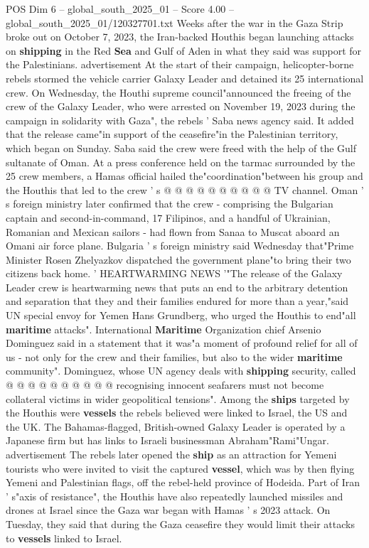 \begin{textsample}{POS Dim 6 – global\_south\_2025\_01 – Score 4.00 – global\_south\_2025\_01/120327701.txt}  \label{ex:f6_pos_353}
Weeks after the war in the Gaza Strip broke out on October 7, 2023, the Iran-backed Houthis began launching attacks on \textbf{shipping} in the Red \textbf{Sea} and Gulf of Aden in what they said was support for the Palestinians. advertisement At the start of their campaign, helicopter-borne rebels stormed the vehicle carrier Galaxy Leader and detained its 25 international crew.
On Wednesday, the Houthi supreme council"announced the freeing of the crew of the Galaxy Leader, who were arrested on November 19, 2023 during the campaign in solidarity with Gaza", the rebels ' Saba news agency said.
It added that the release came"in support of the ceasefire"in the Palestinian territory, which began on Sunday.
Saba said the crew were freed with the help of the Gulf sultanate of Oman.
At a press conference held on the tarmac surrounded by the 25 crew members, a Hamas official hailed the"coordination"between his group and the Houthis that led to the crew ' s @ @ @ @ @ @ @ @ @ @ TV channel.
Oman ' s foreign ministry later confirmed that the crew - comprising the Bulgarian captain and second-in-command, 17 Filipinos, and a handful of Ukrainian, Romanian and Mexican sailors - had flown from Sanaa to Muscat aboard an Omani air force plane.
Bulgaria ' s foreign ministry said Wednesday that"Prime Minister Rosen Zhelyazkov dispatched the government plane"to bring their two citizens back home. ' HEARTWARMING NEWS '"The release of the Galaxy Leader crew is heartwarming news that puts an end to the arbitrary detention and separation that they and their families endured for more than a year,"said UN special envoy for Yemen Hans Grundberg, who urged the Houthis to end"all \textbf{maritime} attacks".
International \textbf{Maritime} Organization chief Arsenio Dominguez said in a statement that it was"a moment of profound relief for all of us - not only for the crew and their families, but also to the wider \textbf{maritime} community".
Dominguez, whose UN agency deals with \textbf{shipping} security, called @ @ @ @ @ @ @ @ @ @ recognising innocent seafarers must not become collateral victims in wider geopolitical tensions".
Among the \textbf{ships} targeted by the Houthis were \textbf{vessels} the rebels believed were linked to Israel, the US and the UK.
The Bahamas-flagged, British-owned Galaxy Leader is operated by a Japanese firm but has links to Israeli businessman Abraham"Rami"Ungar. advertisement The rebels later opened the \textbf{ship} as an attraction for Yemeni tourists who were invited to visit the captured \textbf{vessel}, which was by then flying Yemeni and Palestinian flags, off the rebel-held province of Hodeida.
Part of Iran ' s"axis of resistance", the Houthis have also repeatedly launched missiles and drones at Israel since the Gaza war began with Hamas ' s 2023 attack.
On Tuesday, they said that during the Gaza ceasefire they would limit their attacks to \textbf{vessels} linked to Israel.

\end{textsample}
